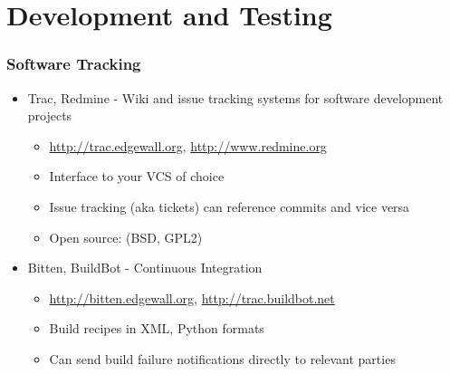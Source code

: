 \documentclass[mathserif]{beamer}
\begin{document}
\section{Development and Testing}

\begin{frame}
  \frametitle{Software Tracking}
  \begin{itemize}\itemsep=.05\textheight
  \item Trac, Redmine - Wiki and issue tracking systems for software development projects
    \begin{itemize}
    \item \url{http://trac.edgewall.org}, \url{http://www.redmine.org}
    \item Interface to your VCS of choice
    \item Issue tracking (aka tickets) can reference commits and vice versa
    \item Open source: (BSD, GPL2)
    \end{itemize}
  \item Bitten, BuildBot - Continuous Integration
    \begin{itemize}
    \item \url{http://bitten.edgewall.org}, \url{http://trac.buildbot.net}
    \item Build recipes in XML, Python formats
    \item Can send build failure notifications directly to relevant parties
    \end{itemize}
  \end{itemize}
\end{frame}





\end{document}
